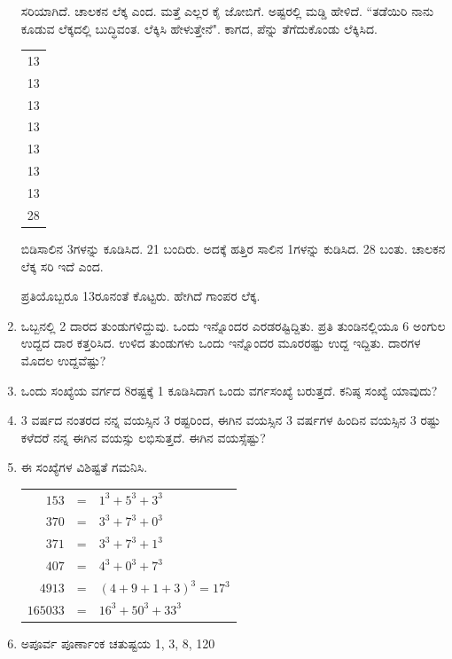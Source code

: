 \begin{enumerate}
ಸರಿಯಾಗಿದೆ. ಚಾಲಕನ ಲೆಕ್ಕ ಎಂದ. ಮತ್ತೆ ಎಲ್ಲರ ಕೈ ಜೋಬಿಗೆ. ಅಷ್ಟರಲ್ಲಿ ಮಡ್ಡಿ ಹೇಳಿದೆ. ``ತಡೆಯಿರಿ ನಾನು ಕೂಡುವ ಲೆಕ್ಕದಲ್ಲಿ ಬುದ್ಧಿವಂತ. ಲೆಕ್ಕಿಸಿ ಹೇಳುತ್ತೇನೆ". ಕಾಗದ, ಪೆನ್ನು ತೆಗೆದುಕೊಂಡು ಲೆಕ್ಕಿಸಿದ. 

\begin{tabular}[t]{c}
13\\
13\\
13\\
13\\
13\\
13\\
13\\
\hline
28\\
\hline
\end{tabular} 

\smallskip

ಬಿಡಿಸಾಲಿನ 3ಗಳನ್ನು ಕೂಡಿಸಿದ. 21 ಬಂದಿರು. ಅದಕ್ಕೆ ಹತ್ತಿರ ಸಾಲಿನ 1ಗಳನ್ನು ಕುಡಿಸಿದ. 28 ಬಂತು. ಚಾಲಕನ ಲೆಕ್ಕ ಸರಿ ಇದೆ ಎಂದ. 

ಪ್ರತಿಯೊಬ್ಬರೂ 13ರೂನಂತೆ ಕೊಟ್ಟರು. ಹೇಗಿದೆ ಗಾಂಪರ ಲೆಕ್ಕ. 

\item ಒಬ್ಬನಲ್ಲಿ 2 ದಾರದ ತುಂಡುಗಳಿದ್ದುವು. ಒಂದು ಇನ್ನೊಂದರ ಎರಡರಷ್ಟಿದ್ದಿತು. ಪ್ರತಿ ತುಂಡಿನಲ್ಲಿಯೂ 6 ಅಂಗುಲ ಉದ್ದದ ದಾರ ಕತ್ತರಿಸಿದ. ಉಳಿದ ತುಂಡುಗಳು ಒಂದು ಇನ್ನೊಂದರ ಮೂರರಷ್ಟು ಉದ್ದ ಇದ್ದಿತು. ದಾರಗಳ ಮೊದಲ ಉದ್ದವೆಷ್ಟು? 

\item ಒಂದು ಸಂಖ್ಯೆಯ ವರ್ಗದ 8ರಷ್ಟಕ್ಕೆ 1 ಕೂಡಿಸಿದಾಗ ಒಂದು ವರ್ಗಸಂಖ್ಯೆ ಬರುತ್ತದೆ. ಕನಿಷ್ಠ ಸಂಖ್ಯೆ ಯಾವುದು? 

\item 3 ವರ್ಷದ ನಂತರದ ನನ್ನ ವಯಸ್ಸಿನ 3 ರಷ್ಟರಿಂದ, ಈಗಿನ ವಯಸ್ಸಿನ 3 ವರ್ಷಗಳ ಹಿಂದಿನ ವಯಸ್ಸಿನ 3 ರಷ್ಟು ಕಳೆದರೆ ನನ್ನ ಈಗಿನ ವಯಸ್ಸು ಲಭಿಸುತ್ತದೆ. ಈಗಿನ ವಯಸ್ಸೆಷ್ಟು? 

\eject

\item ಈ ಸಂಖ್ಯೆಗಳ ವಿಶಿಷ್ಟತೆ ಗಮನಿಸಿ. 

\begin{tabular}[t]{r@{\;}c@{\;}l}
$153$ & = & $1^{3} + 5^{3} + 3^{3}$\\[0.1cm]
$370$ & = & $3^{3} + 7^{3} + 0^{3}$\\[0.1cm]
$371$ & = & $3^{3} + 7^{3} + 1^{3}$\\[0.1cm]
$407$ & = & $4^{3} + 0^{3} + 7^{3}$\\[0.1cm]
$4913$ & = & $(4 + 9 + 1 + 3)^{3} = 17^{3}$\\[0.1cm]
$165033$ & = & $16^{3} + 50^{3} + 33^{3}$
\end{tabular}

\item ಅಪೂರ್ವ ಪೂರ್ಣಾಂಕ ಚತುಷ್ಟಯ 1, 3, 8, 120


\end{enumerate}
